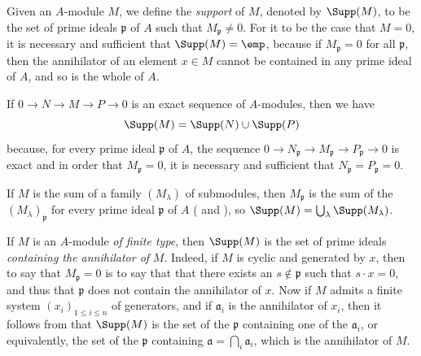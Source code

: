 \begin{env}[1.7.1]
\label{0.1.7.1}
Given an $A$-module $M$, we define the \emph{support} of $M$, denoted by $\Supp(M)$, to be the set of prime ideals $\mathfrak{p}$ of $A$ such that $M_\mathfrak{p}\neq 0$.
For it to be the case that $M=0$, it is necessary and sufficient that $\Supp(M)=\emp$, because if $M_\mathfrak{p}=0$ for all $\mathfrak{p}$, then the annihilator of an element $x\in M$ cannot be contained in any prime ideal of $A$, and so is the whole of $A$.
\end{env}

\begin{env}[1.7.2]
\label{0.1.7.2}
If $0\to N\to M\to P\to 0$ is an exact sequence of $A$-modules, then we have
\[
  \Supp(M)=\Supp(N)\cup\Supp(P)
\]
because, for every prime ideal $\mathfrak{p}$ of $A$, the sequence $0\to N_\mathfrak{p}\to M_\mathfrak{p}\to P_\mathfrak{p}\to 0$ is exact  and in order that $M_\mathfrak{p}=0$, it is necessary and sufficient that $N_\mathfrak{p}=P_\mathfrak{p}=0$.
\end{env}

\begin{env}[1.7.3]
\label{0.1.7.3}
If $M$ is the sum of a family $(M_\lambda)$ of submodules, then $M_\mathfrak{p}$ is the sum of the $(M_\lambda)_\mathfrak{p}$ for every prime ideal $\mathfrak{p}$ of $A$ ( and ), so $\Supp(M)=\bigcup_\lambda\Supp(M_\lambda)$.
\end{env}

\begin{env}[1.7.4]
\label{0.1.7.4}
If $M$ is an $A$-module \emph{of finite type}, then $\Supp(M)$ is the set of prime ideals \emph{containing the annihilator of} $M$.
Indeed, if $M$ is cyclic and generated by $x$, then to say that $M_\mathfrak{p}=0$ is to say that that there exists an $s\not\in\mathfrak{p}$ such that $s\cdot x=0$, and thus that $\mathfrak{p}$ does not contain the annihilator of $x$.
Now if $M$ admits a finite system $(x_i)_{1\leq i\leq n}$ of generators, and if $\mathfrak{a}_i$ is the annihilator of $x_i$, then it follows from  that $\Supp(M)$ is
the set of the $\mathfrak{p}$ containing one of the $\mathfrak{a}_i$, or equivalently, the set of the $\mathfrak{p}$ containing $\mathfrak{a}=\bigcap_i\mathfrak{a}_i$, which is the annihilator of $M$.
\end{env}

